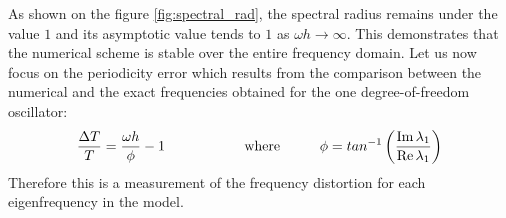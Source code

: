 As shown on the figure \ref{fig:spectral_rad}, the spectral radius remains under the value $1$ and its asymptotic value tends to $1$ as  $\omega h \rightarrow \infty$. This demonstrates that the numerical scheme is stable over the entire frequency domain. 
Let us now focus on the periodicity error which results from the comparison between the numerical and the exact frequencies obtained for the one degree-of-freedom oscillator:
\begin{equation}
    \frac{\Delta T}{T} = \frac{\omega h}{ \phi} - 1 \hspace{2cm}\textnormal{where} \hspace{1cm} \phi=tan^{-1}\left(\frac{\operatorname{Im} \lambda_1}{\operatorname{Re} \lambda_1}  \right)
    \label{eq:period_err}
\end{equation}
Therefore this is a measurement of the frequency distortion for each eigenfrequency in the model. 

